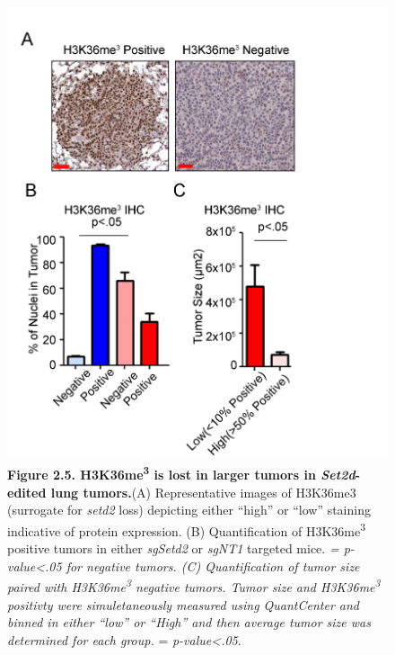 \begin{figure}
\hypertarget{fig:08}{%
\centering
\includegraphics[width=1\textwidth,height=\textheight]{images/tuba5.png}
\caption{\textbf{Figure 2.5. H3K36me\textsuperscript{3} is lost in larger tumors in \emph{Set2d}-edited lung tumors.}(A) Representative images of H3K36me3 (surrogate for \emph{setd2} loss) depicting either ``high'' or ``low'' staining indicative of protein expression. (B) Quantification of H3K36me\textsuperscript{3} positive tumors in either \emph{sgSetd2} or \emph{sgNT1} targeted mice. \emph{= \emph{p-value\textless.05} for negative tumors. (C) Quantification of tumor size paired with H3K36me\textsuperscript{3} negative tumors. Tumor size and H3K36me\textsuperscript{3} positivty were simuletaneously measured using QuantCenter and binned in either ``low'' or ``High'' and then average tumor size was determined for each group. }= \emph{p-value\textless.05}.}\label{fig:08}
}
\end{figure}

